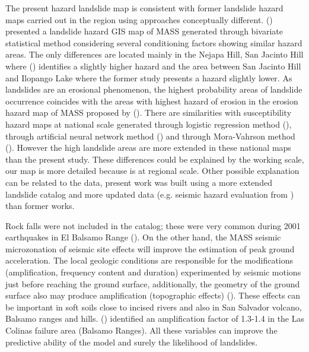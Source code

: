 \documentclass[11pt,twoside]{rmta2010esp}%
\begin{document}
The present hazard landslide map is consistent with former landslide hazard maps carried out in the region using approaches conceptually different. (\cite{fernan2008}) presented a landslide hazard GIS map of MASS generated through bivariate statistical method considering several conditioning factors showing similar hazard areas. The only differences are located mainly in the Nejapa Hill, San Jacinto Hill where (\cite{fernan2008}) identifies a slightly higher hazard and the area between San Jacinto Hill and Ilopango Lake where the former study presents a hazard slightly lower. As landslides are an erosional phenomenon, the highest probability areas of landslide occurrence coincides with the areas with highest hazard of erosion in the erosion hazard map of MASS proposed by (\cite{chavez2014a}). There are similarities with susceptibility hazard maps at national scale generated through logistic regression method (\cite{garcia2008}), through artificial neural network method (\cite{garcia2010}) and through Mora-Vahrson method (\cite{snet2004}). However the high landslide areas are more extended in these national maps than the present study. These differences could be explained by the working scale, our map is more detailed because is at regional scale. Other possible explanation can be related to the data, present work was built using a more extended landslide catalog and more updated data (e.g. seismic hazard evaluation from \cite{beni2012}) than former works.

Rock falls were not included in the catalog; these were very common during 2001 earthquakes in El Balsamo Range (\cite{jibson}). On the other hand, the MASS seismic microzonation of seismic site effects will improve the estimation of peak ground acceleration. The local geologic conditions are responsible for the modifications (amplification, frequency content and duration) experimented by seismic motions just before reaching the ground surface, additionally, the geometry of the ground surface also may produce amplification (topographic effects) (\cite{aki1993}). These effects can be important in soft soils close to incised rivers and also in San Salvador volcano, Balsamo ranges and hills. (\cite{crosta2005}) identified an amplification factor of 1.3-1.4 in the Las Colinas failure area (Balsamo Ranges). All these variables can improve the predictive ability of the model and surely the likelihood of landslides.






\end{document}
